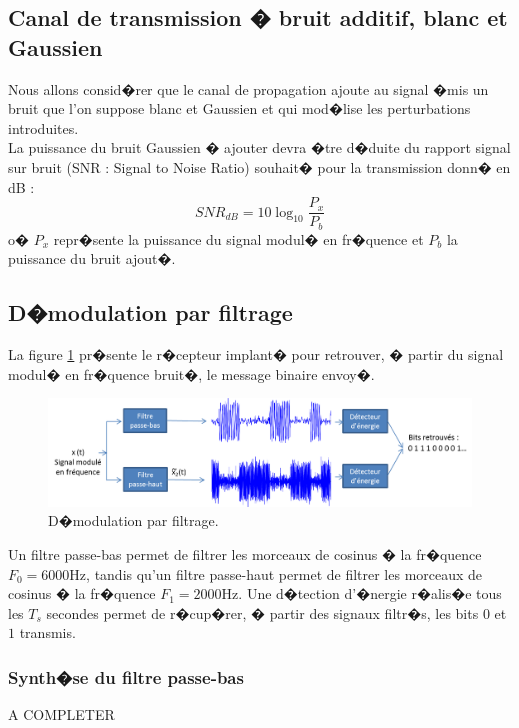 \documentclass[frenchb]{article}
\begin{document}
    \subsection{Canal de transmission � bruit additif, blanc et Gaussien} \label{sec:canal}
    Nous allons consid�rer que le canal de propagation ajoute au signal �mis un bruit que l'on suppose blanc et Gaussien et qui mod�lise les perturbations introduites. \\
    La puissance du bruit Gaussien � ajouter devra �tre d�duite du rapport signal sur bruit (SNR : Signal to Noise Ratio) souhait� pour la transmission donn� en dB :
    $$
    SNR_{dB}=10 \log_{10} \frac{P_x}{P_b}
    $$
    o� $P_x$ repr�sente la puissance du signal modul� en fr�quence et $P_b$ la puissance du bruit ajout�.

    \subsection{D�modulation par filtrage}
    La figure \ref{fig : demod_filtrage} pr�sente le r�cepteur implant� pour retrouver, � partir du signal modul� en fr�quence bruit�, le message binaire envoy�.

    \begin{figure}[ht!]
        \centering
        \includegraphics[width=14cm]{demod_filtrage.png}
        \caption{D�modulation par filtrage. \label{fig : demod_filtrage}}
     \end{figure}

    Un filtre passe-bas permet de filtrer les morceaux de cosinus � la fr�quence $F_0=6000$Hz, tandis qu'un filtre passe-haut permet de filtrer les morceaux de cosinus � la fr�quence $F_1=2000$Hz. Une d�tection d'�nergie r�alis�e tous les $T_s$ secondes permet de r�cup�rer, � partir des signaux filtr�s, les bits $0$ et $1$ transmis.\\

        \subsubsection{Synth�se du filtre passe-bas}
        A COMPLETER
\end{document}
